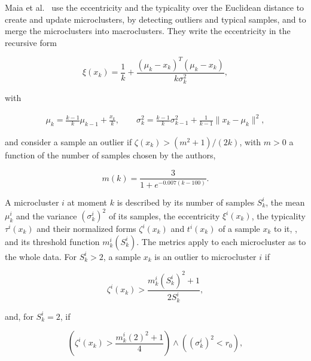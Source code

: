 Maia et al.~\cite{maia2020evolvclus} use the eccentricity and the typicality over the Euclidean distance to create and update microclusters, by detecting outliers and typical samples, and to merge the microclusters into macroclusters. They write the eccentricity in the recursive form

\begin{equation}
    \xi(x_k) = \frac{1}{k} + \frac{\left( \mu_k - x_k \right)^T \left( \mu_k - x_k \right)}{k \sigma^2_k}, \label{eq:recursive_eccentricity}
\end{equation}

with

\begin{gather}
    \mu_k = \frac{k - 1}{k} \mu_{k-1} + \frac{x_k}{k}, \qquad
    \sigma^2_k = \frac{k - 1}{k} \sigma^2_{k-1} + \frac{1}{k - 1} \lVert x_k - \mu_k \rVert^2,
\end{gather}

and consider a sample an outlier if $\zeta(x_k) > (m^2 + 1)/(2k)$, with $m > 0$ a function of the number of samples chosen by the authors,

\begin{equation}
    m(k) = \frac{3}{1 + e^{-0.007(k - 100)}}.
    \label{eq:m_function}
\end{equation}

A microcluster $i$ at moment $k$ is described by its number of samples $S^i_k$, the mean $\mu^i_k$ and the variance $(\sigma^i_k)^2$ of its samples, the eccentricity $\xi^i(x_k)$, the typicality $\tau^i(x_k)$ and their normalized forms $\zeta^i(x_k)$ and $t^i(x_k)$ of a sample $x_k$ to it, , and its threshold function $m^i_k(S^i_k)$. The metrics apply to each microcluster as to the whole data. For $S^i_k > 2$, a sample $x_k$ is an outlier to microcluster $i$ if

\begin{equation}
    \zeta^i(x_k) > \frac{m^i_k(S^i_k)^2 + 1}{2S^i_k}, \label{eq:outlier_condition}
\end{equation}

and, for $S^i_k = 2$, if

\begin{equation}
    \left( \zeta^i(x_k) > \frac{m^i_k(2)^2 + 1}{4} \right) \land \left( \left( \sigma^i_k \right)^2 < r_0 \right), \label{critique:incorrect_condition_logic}
\end{equation}

